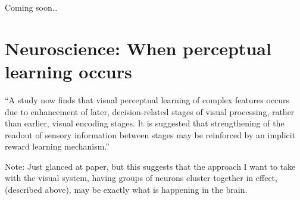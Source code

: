 \documentclass[11pt, a4paper, oneside]{article}   	%
\begin{document}
Coming soon\ldots

\section{Neuroscience: When perceptual learning occurs \cite{Sasaki2017}}

``A study now finds that visual perceptual learning of complex features occurs due to enhancement of later, decision-related stages of visual processing, rather than earlier, visual encoding stages. It is suggested that strengthening of the readout of sensory information between stages may be reinforced by an implicit reward learning mechanism.''


Note: Just glanced at paper, but this suggests that the approach I want to take with the visual system, having groups of neurons cluster together in effect, (described above), may be exactly what is happening in the brain.


%
%
\end{document}
